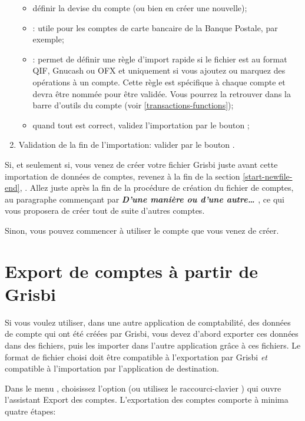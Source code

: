 \begin{enumerate}
\begin{itemize}
			\item définir la devise du compte (ou bien en créer une nouvelle);
			\item {}: utile pour les comptes de carte bancaire de la Banque Postale, par exemple;
			\item {}: permet de définir une règle d'import rapide si le fichier est au format \gls{QIF}, \gls{Gnucash} ou \gls{OFX} et uniquement si vous ajoutez ou marquez des opérations à un compte. Cette règle est spécifique à chaque compte et devra être nommée pour être validée. Vous pourrez la retrouver dans la barre d'outils du compte (voir \vref{transactions-functions});
			\item quand tout est correct, validez l'importation par le bouton ;
		\end{itemize}
	\item Validation de la fin de l'importation: valider par le bouton .
\end{enumerate}

Si, et seulement si, vous venez de créer votre fichier Grisbi juste avant cette importation de données de comptes, revenez à la fin de la section \vref{start-newfile-end}, . Allez juste après la fin de la procédure de création du fichier de comptes, au paragraphe commençant par \textbf{\emph{D'une manière ou d'une autre\ldots{ }}}, ce qui vous proposera de créer tout de suite d'autres comptes.

Sinon, vous pouvez commencer à utiliser le compte que vous venez de créer.


\section{Export de comptes à partir de Grisbi\label{importexport-export}}


Si vous voulez utiliser, dans une autre application de comptabilité, des données de compte qui ont été créées par Grisbi, vous devez d'abord exporter ces données dans des fichiers, puis les importer dans l'autre application grâce à ces fichiers. Le format de fichier choisi doit être compatible à l'exportation par Grisbi \emph{et} compatible à l'importation par l'application de destination.
 
Dans le menu , choisissez l'option  (ou utilisez le raccourci-clavier ) qui ouvre l'assistant Export des comptes. L'exportation des comptes comporte à minima quatre étapes:

